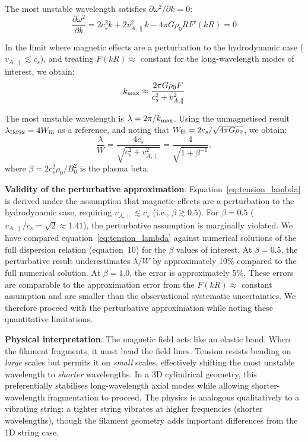 \documentclass[11pt,a4paper]{article}
\begin{document}
The most unstable wavelength satisfies $\partial \omega^2 / \partial k = 0$:
\begin{equation}
\frac{\partial \omega^2}{\partial k} = 2c_s^2 k + 2v_{A,\parallel}^2 k - 4\pi G \rho_0 R F'(kR) = 0
\end{equation}

In the limit where magnetic effects are a perturbation to the hydrodynamic case ($v_{A,\parallel} \lesssim c_s$), and treating $F(kR) \approx$ constant for the long-wavelength modes of interest, we obtain:
\begin{equation}
k_{\rm max} \approx \frac{2\pi G \rho_0 F}{c_s^2 + v_{A,\parallel}^2}
\end{equation}

The most unstable wavelength is $\lambda = 2\pi/k_{\rm max}$. Using the unmagnetised result $\lambda_{\rm IM92} = 4W_{\rm fil}$ as a reference, and noting that $W_{\rm fil} = 2c_s/\sqrt{4\pi G\rho_0}$, we obtain:
\begin{equation}
\frac{\lambda}{W} = \frac{4c_s}{\sqrt{c_s^2 + v_{A,\parallel}^2}} = \frac{4}{\sqrt{1 + \beta^{-1}}},
\label{eq:tension_lambda}
\end{equation}
where $\beta = 2c_s^2\rho_0/B_0^2$ is the plasma beta.

\textbf{Validity of the perturbative approximation}: Equation~\ref{eq:tension_lambda} is derived under the assumption that magnetic effects are a perturbation to the hydrodynamic case, requiring $v_{A,\parallel} \lesssim c_s$ (i.e., $\beta \gtrsim 0.5$). For $\beta = 0.5$ ($v_{A,\parallel}/c_s = \sqrt{2} \approx 1.41$), the perturbative assumption is marginally violated. We have compared equation~\ref{eq:tension_lambda} against numerical solutions of the full dispersion relation (equation~10) for the $\beta$ values of interest. At $\beta = 0.5$, the perturbative result underestimates $\lambda/W$ by approximately 10\% compared to the full numerical solution. At $\beta = 1.0$, the error is approximately 5\%. These errors are comparable to the approximation error from the $F(kR) \approx$ constant assumption and are smaller than the observational systematic uncertainties. We therefore proceed with the perturbative approximation while noting these quantitative limitations.

\textbf{Physical interpretation}: The magnetic field acts like an elastic band. When the filament fragments, it must bend the field lines. Tension resists bending on \textit{large} scales but permits it on \textit{small} scales, effectively shifting the most unstable wavelength to \textit{shorter} wavelengths. In a 3D cylindrical geometry, this preferentially stabilises long-wavelength axial modes while allowing shorter-wavelength fragmentation to proceed. The physics is analogous qualitatively to a vibrating string: a tighter string vibrates at higher frequencies (shorter wavelengths), though the filament geometry adds important differences from the 1D string case.
\end{document}
